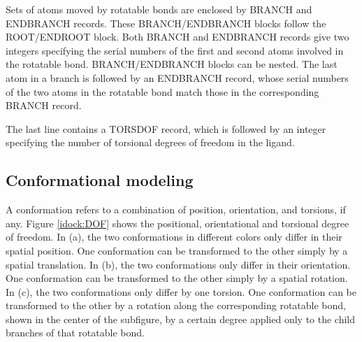 Sets of atoms moved by rotatable bonds are enclosed by BRANCH and ENDBRANCH records. These BRANCH/ENDBRANCH blocks follow the ROOT/ENDROOT block. Both BRANCH and ENDBRANCH records give two integers specifying the serial numbers of the first and second atoms involved in the rotatable bond. BRANCH/ENDBRANCH blocks can be nested. The last atom in a branch is followed by an ENDBRANCH record, whose serial numbers of the two atoms in the rotatable bond match those in the corresponding BRANCH record.

The last line contains a TORSDOF record, which is followed by an integer specifying the number of torsional degrees of freedom in the ligand.

\subsection{Conformational modeling}

A conformation refers to a combination of position, orientation, and torsions, if any. Figure \ref{idock:DOF} shows the positional, orientational and torsional degree of freedom. In (a), the two conformations in different colors only differ in their spatial position. One conformation can be transformed to the other simply by a spatial translation. In (b), the two conformations only differ in their orientation. One conformation can be transformed to the other simply by a spatial rotation. In (c), the two conformations only differ by one torsion. One conformation can be transformed to the other by a rotation along the corresponding rotatable bond, shown in the center of the subfigure, by a certain degree applied only to the child branches of that rotatable bond.

